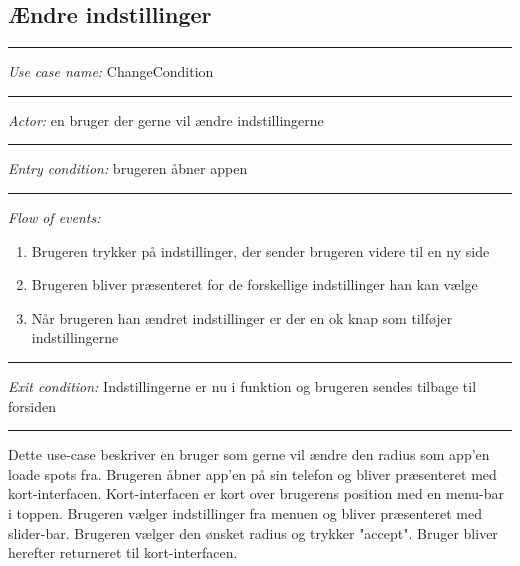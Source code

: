 \documentclass[12pt]{article}
\begin{document}
\subsection*{Ændre indstillinger}
\hrule\vspace{5mm}
\textit{Use case name:} ChangeCondition\\
\hrule\vspace{5mm}
\textit{Actor:} en bruger der gerne vil ændre indstillingerne\\
\hrule\vspace{5mm}
\textit{Entry condition:} brugeren åbner appen\\
\hrule\vspace{5mm}
\textit{Flow of events:}
\begin{enumerate}
\item Brugeren trykker på indstillinger, der sender brugeren videre til en ny side
\item Brugeren bliver præsenteret for de forskellige indstillinger han kan vælge
\item Når brugeren han ændret indstillinger er der en ok knap som tilføjer indstillingerne
\end{enumerate}
\hrule\vspace{5mm}
\textit{Exit condition:} Indstillingerne er nu i funktion og brugeren sendes tilbage til forsiden\\
\hrule\vspace{5mm}
Dette use-case beskriver en bruger som gerne vil ændre den radius som app'en loade spots fra. Brugeren åbner app'en på 
sin telefon og bliver præsenteret med kort-interfacen. Kort-interfacen er kort over brugerens position med en menu-bar i 
toppen. Brugeren vælger indstillinger fra menuen og bliver præsenteret med slider-bar. Brugeren vælger den ønsket radius
og trykker "accept". Bruger bliver herefter returneret til kort-interfacen.
\pagebreak
\end{document}
